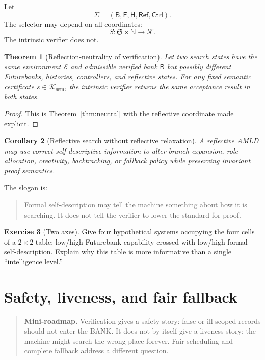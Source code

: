 \documentclass[11pt,openany]{book}
\newtheorem{theorem}{Theorem}[chapter]
\newtheorem{corollary}[theorem]{Corollary}
\theoremstyle{definition}
\newtheorem{exercise}[theorem]{Exercise}
\theoremstyle{remark}
\newenvironment{miniroadmap}{\begin{quote}\small\color{deepblue}\textbf{Mini-roadmap.} }{\end{quote}}
\newcommand{\Bank}{\mathsf{B}}
\newcommand{\Future}{\mathsf{F}}
\newcommand{\Hist}{\mathsf{H}}
\newcommand{\State}{\Sigma}
\newcommand{\StateSpace}{\mathfrak{S}}
\newcommand{\Cert}{\mathcal{K}}
\newcommand{\Env}{\mathcal{E}}
\newcommand{\Refl}{\mathsf{Ref}}
\newcommand{\N}{\mathbb{N}}
\begin{document}
Let
\[
\State=(\Bank,\Future,\Hist,\Refl,\mathsf{Ctrl}).
\]
The selector may depend on all coordinates:
\[
S:\StateSpace\times\N\to\Cert.
\]
The intrinsic verifier does not.

\begin{theorem}[Reflection-neutrality of verification]\label{thm:reflectionneutral}
Let two search states have the same environment $\Env$ and admissible verified bank $\Bank$ but possibly different Futurebanks, histories, controllers, and reflective states. For any fixed semantic certificate $s\in\Cert_{\mathrm{sem}}$, the intrinsic verifier returns the same acceptance result in both states.
\end{theorem}
\begin{proof}
This is Theorem~\ref{thm:neutral} with the reflective coordinate made explicit.
\end{proof}

\begin{corollary}[Reflective search without reflective relaxation]
A reflective AMLD may use correct self-descriptive information to alter branch expansion, role allocation, creativity, backtracking, or fallback policy while preserving invariant proof semantics.
\end{corollary}

The slogan is:
\begin{quote}
Formal self-description may tell the machine something about how it is searching. It does not tell the verifier to lower the standard for proof.
\end{quote}

\begin{exercise}[Two axes]\label{ex:axes}
Give four hypothetical systems occupying the four cells of a $2\times2$ table: low/high Futurebank capability crossed with low/high formal self-description. Explain why this table is more informative than a single ``intelligence level.''
\end{exercise}

\chapter{Safety, liveness, and fair fallback}
\begin{miniroadmap}
Verification gives a safety story: false or ill-scoped records should not enter the BANK. It does not by itself give a liveness story: the machine might search the wrong place forever. Fair scheduling and complete fallback address a different question.
\end{miniroadmap}
\end{document}
